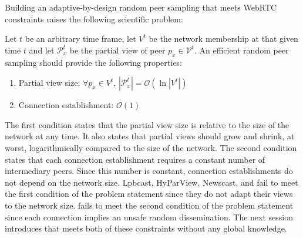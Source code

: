 Building an adaptive-by-design random peer sampling that meets WebRTC
constraints raises the following scientific problem:
\begin{problem}
  Let $t$ be an arbitrary time frame, let $V^t$ be the network membership at
  that given time $t$ and let $\mathcal{P}_x^t$ be the partial view of peer
  $p_x \in \mathcal{V}^t$.  An efficient random peer sampling should provide
  the following properties:
  \begin{enumerate}
  \item Partial view size: \hfill
    $\forall p_x \in V^t,\, |\mathcal{P}_x^t| = \mathcal{O} (\ln
    |V^t|)$      
  \item Connection establishment: \hfill $\mathcal{O}(1)$
  \end{enumerate}
\end{problem}

The first condition states that the partial view size is relative to the size of
the network at any time. It also states that partial views should grow and
shrink, at worst, logarithmically compared to the size of the network. The
second condition states that each connection establishment requires a constant
number of intermediary peers. Since this number is constant, connection
establishments do not depend on the network size.
Lpbcast, HyParView, Newscast, and \CYCLON fail to meet the first condition of
the problem statement since they do not adapt their views to the network
size. \SCAMP fails to meet the second condition of the problem statement since
each connection implies an unsafe random dissemination. The next session
introduces \SPRAY that meets both of these constraints without any global
knowledge.

